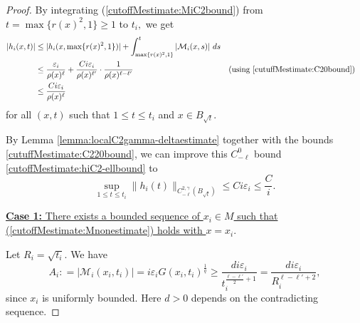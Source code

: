 \documentclass[12pt]{amsart}
\newcommand{\calM}{\mathcal{M}}
\renewcommand{\1}{{\mathbf 1}}
\newcommand{\eps}{{\varepsilon}}
\theoremstyle{others}
\numberwithin{equation}{section}
\begin{document}
\begin{proof}
    By integrating (\ref{cutoffMestimate:MiC2bound}) from $t = \max \{ r(x)^2, 1\}  { \ge 1}$ to $t_i,$ we get
    \begin{gather}\label{cutoffMestimate:hiC2-ellbound}
    \begin{aligned}
        |h_i(x,t) | & \leq |h_i(x,\max \{ r(x)^2, 1\} )| + \int_{\max\{ r(x)^2, 1\} }^t \left| \calM_i(x,s) \right| \, ds \\
        & \leq  \frac{\eps_i}{\rho(x)^{\ell} } + \frac{C i \eps_i}{\rho(x)^{\ell'} } \cdot \frac{1}{\rho(x)^{\ell - \ell' } } 
        && ( \text{using \eqref{cutuffMestimate:C20bound}} )\\
        & \leq \frac{C i \eps_i}{\rho(x)^{\ell} }
        \end{aligned}
    \end{gather}
    for all $(x,t)$ such that $ 1 \le t \le t_i$ and $x \in B_{\sqrt t}$.

    
    By Lemma \ref{lemma:localC2gamma-deltaestimate} 
    together with the bounds \eqref{cutuffMestimate:C220bound},
    we can improve this $C^0_{-\ell}$ bound \eqref{cutoffMestimate:hiC2-ellbound} to
    \begin{equation}\label{cutoffMestimate:hC2gammaellbound}
        \sup_{1 \le t \le t_i} \| h_i(t) \|_{C^{2,\gamma}_{-\ell}(B_{\sqrt{t}})} \leq C i \eps_i \leq \frac{C}{i}.
    \end{equation}



    \vspace{2mm}

\noindent   \underline{ {\bf Case 1:} There exists a bounded sequence of $x_i \in M$ such that (\ref{cutoffMestimate:Mnonestimate}) holds with $x = x_i.$}

Let $R_i = \sqrt{t_i}.$ We have
    \begin{equation}\label{cutoffMestimate:Aidef}
        A_i : = |\calM_i(x_i,t_i) | = i \eps_i G(x_i,t_i)^\frac{1}{q} \geq \frac{d i \eps_i}{t_i^{\frac{\ell - \ell'}{2} + 1} } = \frac{d i \eps_i}{R_i^{\ell - \ell' + 2}  },
    \end{equation}
    since $x_i$ is uniformly bounded. Here $d > 0$ depends on the contradicting sequence.

\end{proof}
\end{document}
